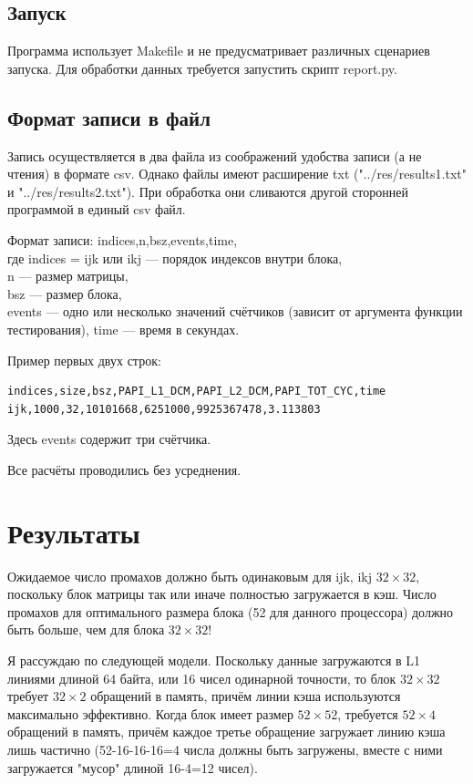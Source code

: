 \documentclass[14pt]{extarticle}
\begin{document}
\subsection*{Запуск}
Программа использует Makefile и не предусматривает различных сценариев запуска.
Для обработки данных требуется запустить скрипт report.py.

\subsection*{Формат записи в файл}
Запись осуществляется в два файла из соображений удобства записи (а не чтения) в формате csv. Однако файлы имеют расширение txt ("../res/results1.txt" и "../res/results2.txt"). При обработка они сливаются другой сторонней программой в единый csv файл.

Формат записи: indices,n,bsz,events,time,\\
где indices = ijk или ikj --- порядок индексов внутри блока,\\
n --- размер матрицы,\\
bsz --- размер блока,\\
events --- одно или несколько значений счётчиков (зависит от аргумента функции тестирования),
time --- время в секундах.

Пример первых двух строк:
\begin{lstlisting}
indices,size,bsz,PAPI_L1_DCM,PAPI_L2_DCM,PAPI_TOT_CYC,time
ijk,1000,32,10101668,6251000,9925367478,3.113803
\end{lstlisting}
Здесь events содержит три счётчика.

Все расчёты проводились без усреднения.



\section*{Результаты}
Ожидаемое число промахов должно быть одинаковым для ijk, ikj $32 \times 32$, поскольку блок матрицы так или иначе полностью загружается в кэш. Число промахов для оптимального размера блока (52 для данного процессора) должно быть больше, чем для блока $32 \times 32$!

Я рассуждаю по следующей модели. Поскольку данные загружаются в L1 линиями длиной 64 байта, или 16 чисел одинарной точности, то блок $32 \times 32$ требует $32 \times 2$ обращений в память, причём линии кэша используются максимально эффективно. Когда блок имеет размер $52 \times 52$, требуется $52 \times 4$ обращений в память, причём каждое третье обращение загружает линию кэша лишь частично (52-16-16-16=4 числа должны быть загружены, вместе с ними загружается "мусор" длиной 16-4=12 чисел).
\end{document}
